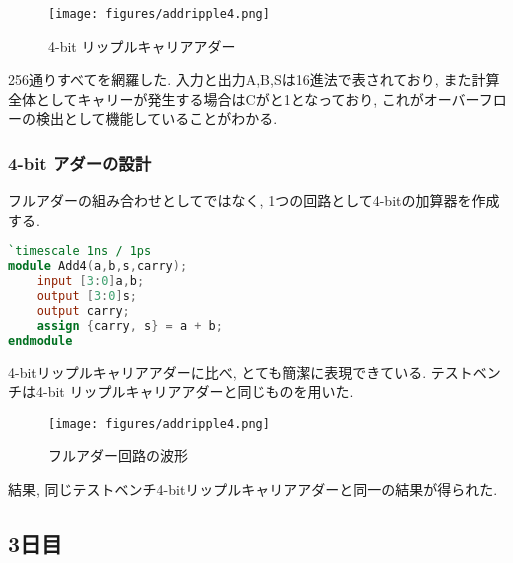 \documentclass[titlepage]{ltjsarticle}
\begin{document}
\begin{figure}[H]
    \begin{center}
        \texttt{[image: figures/addripple4.png]}
        \caption{4-bit リップルキャリアアダー}
    \end{center}
\end{figure}
256通りすべてを網羅した. 入力と出力A,B,Sは16進法で表されており, また計算全体としてキャリーが発生する場合はCがと1となっており, これがオーバーフローの検出として機能していることがわかる. 
\subsubsection{4-bit アダーの設計}
フルアダーの組み合わせとしてではなく, 1つの回路として4-bitの加算器を作成する. 
\begin{lstlisting}[caption=4-bit アダー,language=verilog]
`timescale 1ns / 1ps
module Add4(a,b,s,carry); 
    input [3:0]a,b;
    output [3:0]s;
    output carry;
    assign {carry, s} = a + b;
endmodule    
\end{lstlisting}
4-bitリップルキャリアアダーに比べ, とても簡潔に表現できている. テストベンチは4-bit リップルキャリアアダーと同じものを用いた. 
\begin{figure}[H]
    \begin{center}
        \texttt{[image: figures/addripple4.png]}
        \caption{フルアダー回路の波形}
    \end{center}
\end{figure}
結果, 同じテストベンチ4-bitリップルキャリアアダーと同一の結果が得られた. 
\subsection{3日目}
\end{document}
